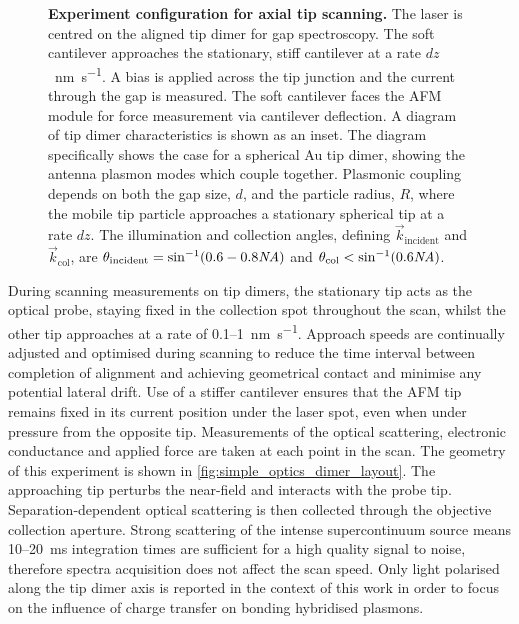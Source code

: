 \documentclass[a4paper]{article}
\begin{document}
\begin{figure}[bt]
\vspace{-10pt}
\centering
\fontsize{10pt}{1em}\selectfont
{}
\caption[Experiment configuration for axial tip scanning]{\textbf{Experiment configuration for axial tip scanning.} The laser is centred on the aligned tip dimer for gap spectroscopy. The soft cantilever approaches the stationary, stiff cantilever at a rate $dz$~\si{\nano\metre\per\second}. A bias is applied across the tip junction and the current through the gap is measured. The soft cantilever faces the AFM module for force measurement via cantilever deflection.
A diagram of tip dimer characteristics is shown as an inset. The diagram specifically shows the case for a spherical Au tip dimer, showing the antenna plasmon modes which couple together. Plasmonic coupling depends on both the gap size, $d$, and the particle radius, $R$, where the mobile tip particle approaches a stationary spherical tip at a rate $dz$. The illumination and collection angles, defining $\vec{k}_{\mathrm{incident}}$ and $\vec{k}_{\mathrm{col}}$, are $\theta_{\mathrm{incident}} = \sin^{-1}(0.6-0.8\mathit{NA})$ and $\theta_{\mathrm{col}} < \sin^{-1}(0.6\mathit{NA})$.
}
\label{fig:simple_optics_dimer_layout}
\vspace{-5pt}
\end{figure}

During scanning measurements on tip dimers, the stationary tip acts as the optical probe, staying fixed in the collection spot throughout the scan, whilst the other tip approaches at a rate of 0.1--\SI{1}{\nano\metre\per\second}. Approach speeds are continually adjusted and optimised during scanning to reduce the time interval between completion of alignment and achieving geometrical contact and minimise any potential lateral drift. Use of a stiffer cantilever ensures that the AFM tip remains fixed in its current position under the laser spot, even when under pressure from the opposite tip. Measurements of the optical scattering, electronic conductance and applied force are taken at each point in the scan. The geometry of this experiment is shown in \autoref{fig:simple_optics_dimer_layout}.
The approaching tip perturbs the near-field and interacts with the probe tip. Separation-dependent optical scattering is then collected through the objective collection aperture. Strong scattering of the intense supercontinuum source means 10--\SI{20}{ms} integration times are sufficient for a high quality signal to noise, therefore spectra acquisition does not affect the scan speed. %
Only light polarised along the tip dimer axis is reported in the context of this work in order to focus on the influence of charge transfer on bonding hybridised plasmons. %
\end{document}
